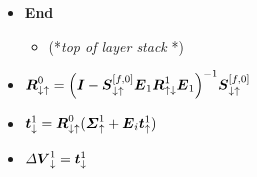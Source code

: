\begin{figure}
{\begin{minipage} {140.0mm}
\begin{itemize}
\begin{itemize}
\item ${\bmi R}_{ \downarrow \downarrow }^{i}={\left({{\bmi  I}-{\bmi S}_{ 
\downarrow \uparrow }^{i} {\bmi  E}_{i+1} {\bmi R}_{ \uparrow \downarrow 
}^{i+1} {\bmi  E}_{i+1} }
\right)}^{-1}{\bmi S}_{ \downarrow \downarrow }^{i} $

\item ${\bmi R}_{ \downarrow \uparrow }^{i} = 
{\left({{\bmi  I}-{\bmi S}_{ \downarrow \uparrow }^{i}
{\bmi  E}_{i+1} {\bmi R}_{ \uparrow \downarrow }^{i+1} {\bmi  E}_{i+1} }\right)}^{-1}
{\bmi S}_{ \downarrow \uparrow }^{i}$



\item  $\left[{\begin{array}{c}
{\bmi t}_{ \uparrow }^{i}\\ {\bmi t}_{ \downarrow }^{i+1}\end{array}}\right]=
\left[{\begin{array}{cc}
{\bmi R}_{ \uparrow \downarrow }^{i}&{\bmi R}_{ \uparrow \uparrow }^{i}\\ 
{\bmi R}_{ \downarrow \downarrow }^{i}&{\bmi R}_{ \downarrow \uparrow 
}^{i}\end{array}}\right]
\left[{\begin{array}{c}{\bmi \Sigma}^{i}_{\downarrow}\\ 
{\bmi \Sigma}^{i+1}_{\uparrow} + {\bmi  E}_{i+1}{  \bmi t}_{ \uparrow }^{i+1}
\end{array}}\right]$
\end{itemize}
\item {\bf  End}

\begin{itemize}
\item  (*{\em top of layer stack\/ }*) 
\end{itemize}
\item ${\mbox{\boldmath$\mit R$\unboldmath}}_{ \downarrow \uparrow }^{0} = 
{\left({{\mbox{\boldmath$\mit I$\unboldmath}}-{\mbox{\boldmath$\mit S$\unboldmath}}_{ \downarrow \uparrow }^{[f,{0}]}
{\mbox{\boldmath$\mit E$\unboldmath}}_{1} {\mbox{\boldmath$\mit R$\unboldmath}}_{ \uparrow \downarrow }^{1} {\mbox{\boldmath$\mit E$\unboldmath}}_{1} }\right)}^{-1}
{\mbox{\boldmath$\mit S$\unboldmath}}_{ \downarrow \uparrow }^{[f,{0}]}$


\item  ${\mbox{\boldmath$\mit t$\unboldmath}}_{ \downarrow }^{1}={\mbox{\boldmath$\mit R$\unboldmath}}_{ \downarrow \uparrow }^{0}
({\mbox{\boldmath$\mit \Sigma$\unboldmath}}^{1}_{\uparrow}+{\mbox{\boldmath$\mit E$\unboldmath}}_{i}{  \mbox{\boldmath$\mit t$\unboldmath}}_{ \uparrow }^{1})$

\item  ${\mit \Delta}{{\mbox{\boldmath$\mit V$\unboldmath}}}_{ \downarrow }^{1}={\mbox{\boldmath$\mit t$\unboldmath}}_{ \downarrow }^{1}$


\end{itemize}
\end{minipage}}
\end{figure}
